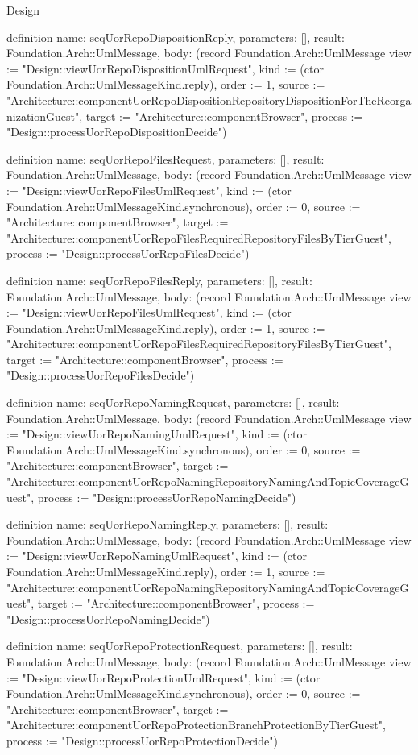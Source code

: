 \begin{lexlean}{Design}
\begin{semanticmodule}
definition{
  name: seqUorRepoDispositionReply,
  parameters: [],
  result: Foundation.Arch::UmlMessage,
  body: (record Foundation.Arch::UmlMessage {view := "Design::viewUorRepoDispositionUmlRequest", kind := (ctor Foundation.Arch::UmlMessageKind.reply), order := 1, source := "Architecture::componentUorRepoDispositionRepositoryDispositionForTheReorganizationGuest", target := "Architecture::componentBrowser", process := "Design::processUorRepoDispositionDecide"})
}

definition{
  name: seqUorRepoFilesRequest,
  parameters: [],
  result: Foundation.Arch::UmlMessage,
  body: (record Foundation.Arch::UmlMessage {view := "Design::viewUorRepoFilesUmlRequest", kind := (ctor Foundation.Arch::UmlMessageKind.synchronous), order := 0, source := "Architecture::componentBrowser", target := "Architecture::componentUorRepoFilesRequiredRepositoryFilesByTierGuest", process := "Design::processUorRepoFilesDecide"})
}

definition{
  name: seqUorRepoFilesReply,
  parameters: [],
  result: Foundation.Arch::UmlMessage,
  body: (record Foundation.Arch::UmlMessage {view := "Design::viewUorRepoFilesUmlRequest", kind := (ctor Foundation.Arch::UmlMessageKind.reply), order := 1, source := "Architecture::componentUorRepoFilesRequiredRepositoryFilesByTierGuest", target := "Architecture::componentBrowser", process := "Design::processUorRepoFilesDecide"})
}

definition{
  name: seqUorRepoNamingRequest,
  parameters: [],
  result: Foundation.Arch::UmlMessage,
  body: (record Foundation.Arch::UmlMessage {view := "Design::viewUorRepoNamingUmlRequest", kind := (ctor Foundation.Arch::UmlMessageKind.synchronous), order := 0, source := "Architecture::componentBrowser", target := "Architecture::componentUorRepoNamingRepositoryNamingAndTopicCoverageGuest", process := "Design::processUorRepoNamingDecide"})
}

definition{
  name: seqUorRepoNamingReply,
  parameters: [],
  result: Foundation.Arch::UmlMessage,
  body: (record Foundation.Arch::UmlMessage {view := "Design::viewUorRepoNamingUmlRequest", kind := (ctor Foundation.Arch::UmlMessageKind.reply), order := 1, source := "Architecture::componentUorRepoNamingRepositoryNamingAndTopicCoverageGuest", target := "Architecture::componentBrowser", process := "Design::processUorRepoNamingDecide"})
}

definition{
  name: seqUorRepoProtectionRequest,
  parameters: [],
  result: Foundation.Arch::UmlMessage,
  body: (record Foundation.Arch::UmlMessage {view := "Design::viewUorRepoProtectionUmlRequest", kind := (ctor Foundation.Arch::UmlMessageKind.synchronous), order := 0, source := "Architecture::componentBrowser", target := "Architecture::componentUorRepoProtectionBranchProtectionByTierGuest", process := "Design::processUorRepoProtectionDecide"})
}


\end{semanticmodule}
\end{lexlean}
